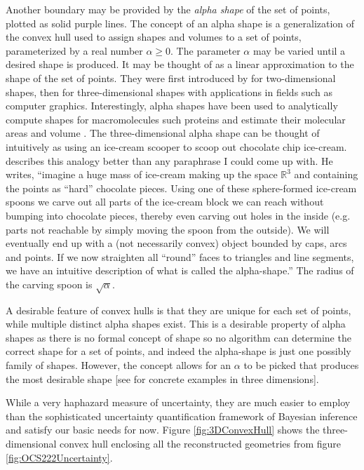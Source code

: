 Another boundary may be provided by the \emph{alpha shape} of the set of points, plotted as solid purple lines. The concept of an alpha shape is a generalization of the convex hull used to assign shapes and volumes to a set of points, parameterized by a real number $\alpha \ge 0$. The parameter $\alpha$ may be varied until a desired shape is produced. It may be thought of as a linear approximation to the shape of the set of points. They were first introduced by \citet{Edelsbrunner83} for two-dimensional shapes, then for three-dimensional shapes \citep{Edelsbrunner94} with applications in fields such as computer graphics. Interestingly, alpha shapes have been used to analytically compute shapes for macromolecules such proteins and estimate their molecular areas and volume \citep{Liang98}. The three-dimensional alpha shape can be thought of intuitively as using an ice-cream scooper to scoop out chocolate chip ice-cream. \citep{Da17} describes this analogy better than any paraphrase I could come up with. He writes, ``imagine a huge mass of ice-cream making up the space $\mathbb{R}^3$ and containing the points as ``hard'' chocolate pieces. Using one of these sphere-formed ice-cream spoons we carve out all parts of the ice-cream block we can reach without bumping into chocolate pieces, thereby even carving out holes in the inside (e.g. parts not reachable by simply moving the spoon from the outside). We will eventually end up with a (not necessarily convex) object bounded by caps, arcs and points. If we now straighten all ``round'' faces to triangles and line segments, we have an intuitive description of what is called the alpha-shape.'' The radius of the carving spoon is $\sqrt{\alpha}$.

A desirable feature of convex hulls is that they are unique for each set of points, while multiple distinct alpha shapes exist. This is a desirable property of alpha shapes as there is no formal concept of shape so no algorithm can determine the correct shape for a set of points, and indeed the alpha-shape is just one possibly family of shapes. However, the concept allows for an $\alpha$ to be picked that produces the most desirable shape [see \citet{Edelsbrunner94} for concrete examples in three dimensions].

While a very haphazard measure of uncertainty, they are much easier to employ than the sophisticated uncertainty quantification framework of Bayesian inference and satisfy our basic needs for now. Figure \ref{fig:3DConvexHull} shows the three-dimensional convex hull enclosing all the reconstructed geometries from figure \ref{fig:OCS222Uncertainty}.

